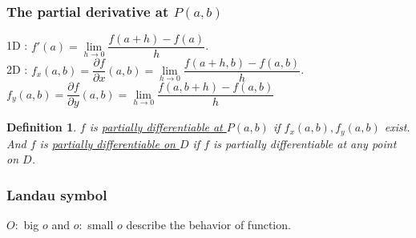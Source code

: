 \documentclass[a4paper,10pt]{article}
\newtheorem{defi}{Definition}
\begin{document}
\subsubsection{The partial derivative at $ P(a,b) $}
1D : $ f\prime(a) = \lim\limits_{h\rightarrow 0} \dfrac{f(a+h)-f(a)}{h} $.\\
2D : $ f_{x}(a,b) = \dfrac{\partial f}{\partial x} (a,b) = \lim\limits_{h\rightarrow 0} \dfrac{f(a+h,b)-f(a,b)}{h} $.\\
$ f_{y}(a,b) = \dfrac{\partial f}{\partial y} (a,b) = \lim\limits_{h\rightarrow 0} \dfrac{f(a,b+h)-f(a,b)}{h} $

\begin{defi}
	$ f $ is \underline{partially differentiable at $ P(a,b) $} if $ f_{x}(a,b), f_{y}(a,b) $ exist. And $ f $ is \underline{partially differentiable on $ D $} if $ f $ is partially differentiable at any point on $ D $.
\end{defi}

\subsubsection{Landau symbol}
$ O : $ big $ o $ and $ o : $ small $ o $ describe the behavior of function.
\end{document}
